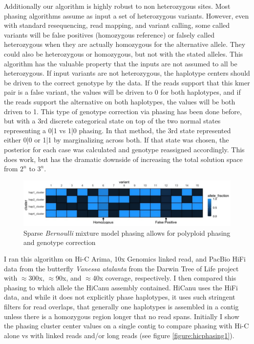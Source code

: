\par{
Additionally our algorithm is highly robust to non heterozygous sites. Most phasing algorithms assume as input a set of heterozygous variants. However, even with standard resequencing, read mapping, and variant calling, some called variants will be false positives (homozygous reference) or falsely called heterozygous when they are actually homozygous for the alternative allele. They could also be heterozygous or homozygous, but not with the stated alleles. This algorithm has the valuable property that the inputs are not assumed to all be heterozygous. If input variants are not heterozygous, the haplotype centers should be driven to the correct genotype by the data. If the reads support that this kmer pair is a false variant, the values will be driven to 0 for both haplotypes, and if the reads support the alternative on both haplotypes, the values will be both driven to 1. This type of genotype correction via phasing has been done before, but with a 3rd discrete categorical state on top of the two normal states representing a 0|1 vs 1|0 phasing\cite{mypatent}. In that method, the 3rd state represented either 0|0 or 1|1 by marginalizing across both. If that state was chosen, the posterior for each case was calculated and genotype reassigned accordingly. This does work, but has the dramatic downside of increasing the total solution space from $2^n$ to $3^n$.
} 


\begin{figure}[htbp!]
\caption{Sparse \textit{Bernoulli} mixture model phasing allows for polyploid phasing and genotype correction}
\label{figure:bernoulli}
\begin{centering}
\includegraphics[width=\textwidth]{poly.png}
\end{centering}
\end{figure}


\par{
I ran this algorithm on Hi-C Arima, 10x Genomics linked read, and PacBio HiFi data from the butterfly \textit{Vanessa atalanta} from the Darwin Tree of Life project with $\approx$300x, $\approx$90x, and $\approx$40x coverage, respectively. I then compared this phasing to which allele the HiCanu assembly contained. HiCanu uses the HiFi data, and while it does not explicitly phase haplotypes, it uses such stringent filters for read overlaps, that generally one haplotypes is assembled in a contig unless there is a homozygous region longer that no read spans. Initially I show the phasing cluster center values on a single contig to compare phasing with Hi-C alone vs with linked reads and/or long reads (see figure \ref{figure:hicphasing1}).
}

